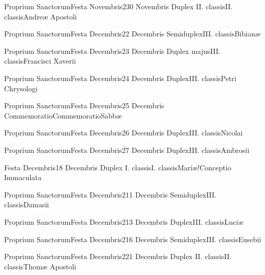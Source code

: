 \documentclass[invitatoriale-romanum.tex]{subfiles}
\begin{document}
	{Proprium Sanctorum}{Festa Novembris}{2}{30 Novembris}
	{Duplex II. classis}{II. classis}{Andreæ Apostoli}
	{}
	{}

\pagebreak


	{Proprium Sanctorum}{Festa Decembris}{2}{2 Decembris}
	{Semiduplex}{III. classis}{Bibianæ}
	{}
	{}

	{Proprium Sanctorum}{Festa Decembris}{2}{3 Decembris}
	{Duplex majus}{III. classis}{Francisci Xaverii}
	{}
	{}

	{Proprium Sanctorum}{Festa Decembris}{2}{4 Decembris}
	{Duplex}{III. classis}{Petri Chrysologi}
	{}
	{}

	{Proprium Sanctorum}{Festa Decembris}{2}{5 Decembris}
	{Commemoratio}{Commemoratio}{Sabbæ}
	{}
	{}
\invitferia

	{Proprium Sanctorum}{Festa Decembris}{2}{6 Decembris}
	{Duplex}{III. classis}{Nicolai}
	{}
	{}

	{Proprium Sanctorum}{Festa Decembris}{2}{7 Decembris}
	{Duplex}{III. classis}{Ambrosii}
	{}
	{}

	{Festa Decembris}{1}{8 Decembris}
	{Duplex I. classis}{I. classis}{Mariæ!Conceptio Immaculata}
	{}
	{}

	{Proprium Sanctorum}{Festa Decembris}{2}{11 Decembris}
	{Semiduplex}{III. classis}{Damasii}
	{}
	{}

	{Proprium Sanctorum}{Festa Decembris}{2}{13 Decembris}
	{Duplex}{III. classis}{Luciæ}
	{}
	{}

	{Proprium Sanctorum}{Festa Decembris}{2}{16 Decembris}
	{Semiduplex}{III. classis}{Eusebii}
	{}
	{}

	{Proprium Sanctorum}{Festa Decembris}{2}{21 Decembris}
	{Duplex II. classis}{II. classis}{Thomæ Apostoli}
	{}
	{}
\end{document}
